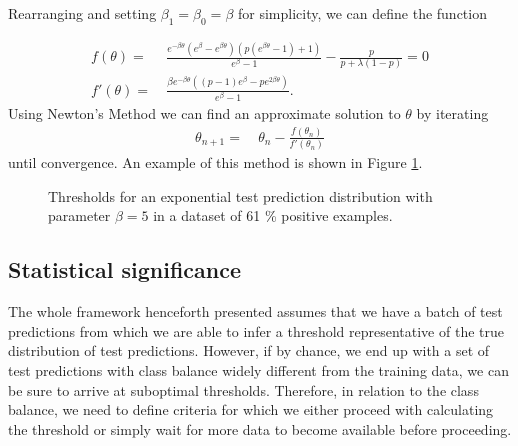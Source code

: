 \documentclass{article}
\begin{document}
Rearranging and setting $\beta_1 = \beta_0 = \beta$ for simplicity, we can define the function

\begin{align}
    f(\theta) =& \ \frac{e^{-\beta \theta} (e^\beta-e^{\beta \theta}) (p(e^{\beta \theta}-1) + 1)}{e^{\beta}-1} - \frac{p}{p+\lambda(1-p)} = 0 \\
    f'(\theta) =& \ \frac{\beta e^{-\beta \theta} ((p-1) e^\beta - p e^{2\beta \theta})}{e^{\beta}-1}\text{.}
\end{align}
Using Newton's Method we can find an approximate solution to $\theta$ by iterating
\begin{align}
    \theta_{n+1} =& \ \theta_n - \frac{f(\theta_n)}{f'(\theta_n)}
\end{align}
until convergence. An example of this method is shown in Figure \ref{fig:exp5}.
\begin{figure}
    \centering
    \scalebox{.8}{}
    \caption{Thresholds for an exponential test prediction distribution with parameter $\beta = 5$ in a dataset of 61 \% positive examples.}
    \label{fig:exp5}
\end{figure}

\subsection{Statistical significance}
The whole framework henceforth presented assumes that we have a batch of test predictions from which we are able to infer a threshold representative of the true distribution of test predictions. However, if by chance, we end up with a set of test predictions with class balance widely different from the training data, we can be sure to arrive at suboptimal thresholds. Therefore, in relation to the class balance, we need to define criteria for which we either proceed with calculating the threshold or simply wait for more data to become available before proceeding. \\
\end{document}
